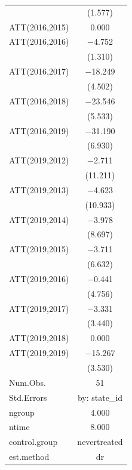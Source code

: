 \documentclass[
]{article}
\begin{document}
\begin{table}
\begin{tabular}[t]{lc}
 & (\num{1.577})\\
ATT(2016,2015) & \num{0.000}\\
ATT(2016,2016) & \num{-4.752}\\
 & (\num{1.310})\\
ATT(2016,2017) & \num{-18.249}\\
 & (\num{4.502})\\
ATT(2016,2018) & \num{-23.546}\\
 & (\num{5.533})\\
ATT(2016,2019) & \num{-31.190}\\
 & (\num{6.930})\\
ATT(2019,2012) & \num{-2.711}\\
 & (\num{11.211})\\
ATT(2019,2013) & \num{-4.623}\\
 & (\num{10.933})\\
ATT(2019,2014) & \num{-3.978}\\
 & (\num{8.697})\\
ATT(2019,2015) & \num{-3.711}\\
 & (\num{6.632})\\
ATT(2019,2016) & \num{-0.441}\\
 & (\num{4.756})\\
ATT(2019,2017) & \num{-3.331}\\
 & (\num{3.440})\\
ATT(2019,2018) & \num{0.000}\\
ATT(2019,2019) & \num{-15.267}\\
 & (\num{3.530})\\
\midrule
Num.Obs. & \num{51}\\
Std.Errors & by: state\_id\\
ngroup & \num{4.000}\\
ntime & \num{8.000}\\
control.group & nevertreated\\
est.method & dr\\
\bottomrule
\end{tabular}
\end{table}
\end{document}
